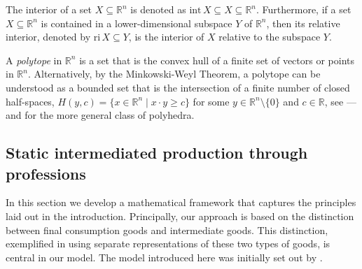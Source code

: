 \documentclass[11pt,fleqn]{article}
\newcounter{llst}
\newenvironment{abet}{\begin{list}{\rm (\alph{llst})}{\usecounter{llst}
		\setlength{\itemindent}{0em} \setlength{\leftmargin}{3em}
		\setlength{\labelwidth}{2em} \setlength{\labelsep}{1em}}}{\end{list}}
\newtheorem{lemma}[theorem]{Lemma}
\begin{document}

\noindent
The interior of a set $X \subseteq \mathbb R^n$ is denoted as $\mathrm{int} \, X \subseteq X \subseteq \mathbb R^n$. Furthermore, if a set $X \subseteq \mathbb R^n$ is contained in a lower-dimensional subspace $Y$ of $\mathbb R^n$, then its relative interior, denoted by $\mathrm{ri} \, X \subseteq Y$, is the interior of $X$ relative to the subspace $Y$. 

A \emph{polytope} in $\mathbb R^n$ is a set that is the convex hull of a finite set of vectors or points in $\mathbb R^n$. Alternatively, by the Minkowski-Weyl Theorem, a polytope can be understood as a bounded set that is the intersection of a finite number of closed half-spaces, $H(y,c) = \{ x \in \mathbb R^n \mid x\cdot y \geqslant c \}$ for some $y \in \mathbb R^n \setminus \{ 0 \}$ and $c \in \mathbb R$, see \citet[Proposition 3.1.2]{Convexity2024}---and \citet[Theorem 19.1]{Rockafellar1970} for the more general class of polyhedra. 


\subsection{Static intermediated production through professions}

In this section we develop a mathematical framework that captures the principles laid out in the introduction. Principally, our approach is based on the distinction between final consumption goods and intermediate goods. This distinction, exemplified in using separate representations of these two types of goods, is central in our model. The model introduced here was initially set out by \citet[Chapter 6]{SDL-2}.
\end{document}
